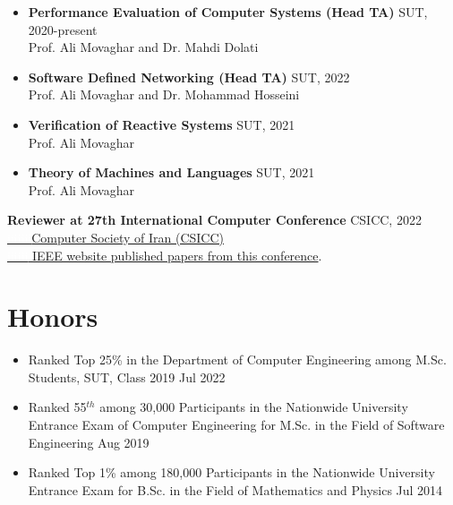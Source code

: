 \documentclass[11pt]{article}
\begin{document}
\begin{itemize}

	\item \textbf{Performance Evaluation of Computer Systems (Head TA)} \hfill SUT, 2020-present
		\\ Prof. Ali Movaghar and Dr. Mahdi Dolati
	\item \textbf{Software Defined Networking (Head TA)} \hfill SUT, 2022
		\\ Prof. Ali Movaghar and Dr. Mohammad Hosseini
	\item \textbf{Verification of Reactive Systems} \hfill SUT, 2021
		\\ Prof. Ali Movaghar 
	\item \textbf{Theory of Machines and Languages} \hfill SUT, 2021
		\\ Prof. Ali Movaghar 

\end{itemize}
\large\large\textbf{Reviewer at 27th International Computer Conference} \hfill CSICC, 2022 \\
 \href{http://csi.org.ir/csicc2022/index-2.html}{ \textcolor{white}{iiiiiii}Computer Society of Iran (CSICC)}\\ \href{https://ieeexplore.ieee.org/xpl/conhome/9780464/proceeding}{ \textcolor{white}{iiiiii} IEEE website published papers from this conference}.

\section{Honors}
\begin{itemize}
	\renewcommand\labelitemi{\ding{118}}
	\item{Ranked Top 25\% in the Department of Computer Engineering among M.Sc. Students, SUT, Class 2019 \hfill Jul 2022}\vspace{-2mm}
	\item {Ranked 55$^{th}$ among 30,000 Participants in the Nationwide University Entrance Exam of Computer Engineering for M.Sc. in the Field of Software Engineering \hfill Aug 2019}\vspace{-2mm}
	\item{Ranked Top 1\% among 180,000 Participants in the Nationwide University Entrance Exam for B.Sc. in the Field of Mathematics and Physics  \hfill Jul 2014}
\end{itemize}
\end{document}
